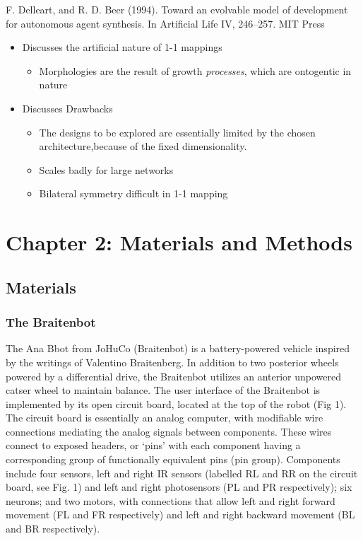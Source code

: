 \documentclass[11pt]{article}
\begin{document}
F. Delleart, and R. D. Beer (1994). Toward an evolvable
model of development for autonomous agent synthesis. In
Artificial Life IV, 246–257. MIT Press
\begin{itemize}
\item Discusses the artificial nature of 1-1 mappings
\begin{itemize}
\item Morphologies are the result of growth \emph{processes}, which are ontogentic in nature
\end{itemize}
\item Discusses Drawbacks
\begin{itemize}
\item The designs to be explored are essentially limited by the chosen architecture,because of the fixed dimensionality.
\item Scales badly for large networks
\item Bilateral symmetry difficult in 1-1 mapping
\end{itemize}
\end{itemize}
\section*{Chapter 2: Materials and Methods}
\label{sec:orgheadline21}
\subsection*{Materials}
\label{sec:orgheadline20}
\subsubsection*{The Braitenbot}
\label{sec:orgheadline14}

The Ana Bbot from JoHuCo (Braitenbot) is a battery-powered vehicle inspired by the writings of Valentino Braitenberg. In addition to two posterior wheels powered by a differential drive, the Braitenbot utilizes an anterior unpowered catser wheel to maintain balance. The user interface of the Braitenbot is implemented by its open circuit board, located at the top of the robot (Fig 1). The circuit board is essentially an analog computer, with modifiable wire connections mediating the analog signals between components. These wires connect to exposed headers, or ‘pins’ with each component having a corresponding group of functionally equivalent pins (pin group). Components include four sensors, left and right IR sensors (labelled RL and RR on the circuit board, see Fig. 1) and left 
and right photosensors (PL and PR respectively); six neurons; and two motors, with connections that allow left and right forward movement
 (FL and FR respectively) and left and right backward movement (BL and BR respectively). 
\end{document}

